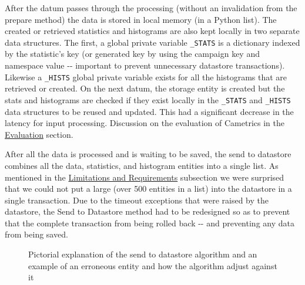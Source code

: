 \documentclass[10pt,a4paper,english]{article}
\begin{document}
After the datum passes through the processing (without an invalidation from the prepare method) the data is stored in local memory (in a Python list). The created or retrieved statistics and histograms are also kept locally in two separate data structures. The first, a global private variable \texttt{{\_}STATS} is a dictionary indexed by the statistic's key (or generated key by using the campaign key and namespace value -{}- important to prevent unnecessary datastore transactions). Likewise a \texttt{{\_}HISTS} global private variable exists for all the histograms that are retrieved or created. On the next datum, the storage entity is created but the stats and histograms are checked if they exist locally in the \texttt{{\_}STATS} and \texttt{{\_}HISTS} data structures to be reused and updated. This had a significant decrease in the latency for input processing. Discussion on the evaluation of Cametrics in the \href{\#evaluation}{Evaluation} section.

After all the data is processed and is waiting to be saved, the send to datastore combines all the data, statistics, and histogram entities into a single list. As mentioned in the \href{\#limitations-and-requirements}{Limitations and Requirements} subsection we were surprised that we could not put a large (over 500 entities in a list) into the datastore in a single transaction. Due to the timeout exceptions that were raised by the datastore, the Send to Datastore method had to be redesigned so as to prevent that the complete transaction from being rolled back -{}- and preventing any data from being saved.
\begin{figure}[htbp]
\centering

\caption{Pictorial explanation of the send to datastore algorithm and an example of an erroneous entity and how the algorithm adjust against it}\end{figure}
\end{document}
